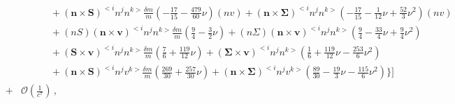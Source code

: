 {\begin{eqnarray}
&& \qquad\quad+ (\mathbf{n}\times\mathbf{S})^{<i} n^{j} n^{k>}\frac{\delta m}{m}\left(-\frac{17}{15} -\frac{479}{60} \nu\right) (nv)
+ (\mathbf{n}\times\mathbf{\Sigma})^{<i} n^{j} n^{k>}\left(-\frac{17}{15} -\frac{1}{12} \nu + \frac{52}{3} \nu^2\right) (nv) \nonumber \\ 
&& \qquad\quad+ (nS) (\mathbf{n}\times\mathbf{v})^{<i} n^{j} n^{k>}\frac{\delta m}{m}\left(\frac{9}{4} -\frac{3}{2} \nu\right)
+ (n\Sigma ) (\mathbf{n}\times\mathbf{v})^{<i} n^{j} n^{k>}\left(\frac{9}{4} -\frac{33}{4} \nu + \frac{9}{4} \nu^2\right) \nonumber \\ 
&& \qquad\quad+ (\mathbf{S}\times\mathbf{v})^{<i} n^{j} n^{k>}\frac{\delta m}{m}\left(\frac{7}{6} + \frac{119}{12} \nu\right)
+ (\mathbf{\Sigma}\times\mathbf{v})^{<i} n^{j} n^{k>}\left(\frac{1}{6} + \frac{119}{12} \nu -\frac{253}{6} \nu^2\right) \nonumber \\ 
&& \qquad\quad+ (\mathbf{n}\times\mathbf{S})^{<i} n^{j} v^{k>}\frac{\delta m}{m}\left(\frac{269}{30} + \frac{257}{30} \nu\right)
+ (\mathbf{n}\times\mathbf{\Sigma})^{<i} n^{j} v^{k>}\left(\frac{89}{30} -\frac{19}{3} \nu -\frac{115}{6} \nu^2\right)\bigg\}\Bigg]\nonumber\\
&+&\mathcal{O}\left(\frac{1}{c^7}\right)\,,
\end{eqnarray}}